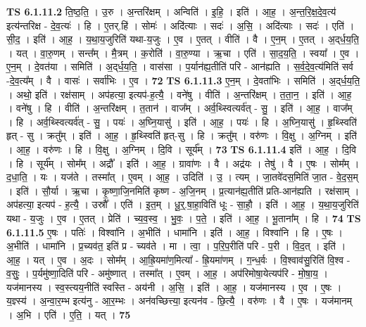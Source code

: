 \documentclass[17pt]{extarticle}
\begin{document}
                                \textbf{ TS 6.1.11.2} \newline
                  ति॒ष्ठ॒ति॒ । उ॒रु । अ॒न्तरि॑क्षम् । अन्विति॑ । इ॒हि॒ । इति॑ । आ॒ह॒ । अ॒न्त॒रि॒क्ष॒दे॒व॒त्य॑ इत्य॑न्तरिक्ष - दे॒व॒त्यः॑ । हि । ए॒तर्.हि॑ । सोमः॑ । अदि॑त्याः । सदः॑ । अ॒सि॒ । अदि॑त्याः । सदः॑ । एति॑ । सी॒द॒ । इति॑ । आ॒ह॒ । य॒था॒य॒जुरिति॑ यथा-य॒जुः । ए॒व । ए॒तत् । वीति॑ । वै । ए॒न॒म् । ए॒तत् । अ॒द्‌र्ध॒य॒ति॒ । यत् । वा॒रु॒णम् । सन्त᳚म् । मै॒त्रम् । क॒रोति॑ । वा॒रु॒ण्या । ऋ॒चा । एति॑ । सा॒द॒य॒ति॒ । स्वया᳚ । ए॒व । ए॒न॒म् । दे॒वत॑या । समिति॑ । अ॒द्‌र्ध॒य॒ति॒ । वास॑सा । प॒र्यान॑ह्य॒तीति॑ परि - आन॑ह्यति । स॒र्व॒दे॒व॒त्य॑मिति॑ सर्व -दे॒व॒त्य᳚म् । वै । वासः॑ । सर्वा॑भिः । ए॒व । \textbf{  72} \newline
                  \newline
                                \textbf{ TS 6.1.11.3} \newline
                  ए॒न॒म् । दे॒वता॑भिः । समिति॑ । अ॒द्‌र्ध॒य॒ति॒ । अथो॒ इति॑ । रक्ष॑साम् । अप॑हत्या॒ इत्यप॑-ह॒त्यै॒ । वने॑षु । वीति॑ । अ॒न्तरि॑क्षम् । त॒ता॒न॒ । इति॑ । आ॒ह॒ । वने॑षु । हि । वीति॑ । अ॒न्तरि॑क्षम् । त॒तान॑ । वाज᳚म् । अर्व॒थ्स्वित्यर्व॑त् - सु॒ । इति॑ । आ॒ह॒ । वाज᳚म् । हि । अर्व॒थ्स्वित्यर्व॑त् - सु॒ । पयः॑ । अ॒घ्नि॒यासु॑ । इति॑ । आ॒ह॒ । पयः॑ । हि । अ॒घ्नि॒यासु॑ । हृ॒थ्स्विति॑ हृत् - सु । क्रतु᳚म् । इति॑ । आ॒ह॒ । हृ॒थ्स्विति॑ हृत्-सु । हि । क्रतु᳚म् । वरु॑णः । वि॒क्षु । अ॒ग्निम् । इति॑ । आ॒ह॒ । वरु॑णः । हि । वि॒क्षु । अ॒ग्निम् । दि॒वि । सूर्य᳚म् । \textbf{  73} \newline
                  \newline
                                \textbf{ TS 6.1.11.4} \newline
                  इति॑ । आ॒ह॒ । दि॒वि । हि । सूर्य᳚म् । सोम᳚म् । अद्रौ᳚ । इति॑ । आ॒ह॒ । ग्रावा॑णः । वै । अद्र॑यः । तेषु॑ । वै । ए॒षः । सोम᳚म् । द॒धा॒ति॒ । यः । यज॑ते । तस्मा᳚त् । ए॒वम् । आ॒ह॒ । उदिति॑ । उ॒ । त्यम् । जा॒तवे॑दस॒मिति॑ जा॒त - वे॒द॒स॒म् । इति॑ । सौ॒र्या । ऋ॒चा । कृ॒ष्णा॒जि॒नमिति॑ कृष्ण - अ॒जि॒नम् । प्र॒त्यान॑ह्य॒तीति॑ प्रति-आन॑ह्यति । रक्ष॑साम् । अप॑हत्या॒ इत्यप॑ - ह॒त्यै॒ । उस्रौ᳚ । एति॑ । इ॒त॒म् । धू॒र्॒.षा॒हा॒विति॑ धूः - सा॒हौ॒ । इति॑ । आ॒ह॒ । य॒था॒य॒जुरिति॑ यथा - य॒जुः । ए॒व । ए॒तत् । प्रेति॑ । च्य॒व॒स्व॒ । भु॒वः॒ । प॒ते॒ । इति॑ । आ॒ह॒ । भू॒ताना᳚म् । हि । \textbf{  74} \newline
                  \newline
                                \textbf{ TS 6.1.11.5} \newline
                  ए॒षः । पतिः॑ । विश्वा॑नि । अ॒भीति॑ । धामा॑नि । इति॑ । आ॒ह॒ । विश्वा॑नि । हि । ए॒षः । अ॒भीति॑ । धामा॑नि । प्र॒च्यव॑त॒ इति॑ प्र - च्यव॑ते । मा । त्वा॒ । प॒रि॒प॒रीति॑ परि - प॒री । वि॒द॒त् । इति॑ । आ॒ह॒ । यत् । ए॒व । अ॒दः । सोम᳚म् । आ॒ह्रि॒यमा॑ण॒मित्या᳚ - ह्रि॒यमा॑णम् । ग॒न्ध॒र्वः । वि॒श्वाव॑सु॒रिति॑ वि॒श्व - व॒सुः॒ । प॒र्यमु॑ष्णा॒दिति॑ परि - अमु॑ष्णात् । तस्मा᳚त् । ए॒वम् । आ॒ह॒ । अप॑रिमोषा॒येत्यप॑रि - मो॒षा॒य॒ । यज॑मानस्य । स्व॒स्त्यय॒नीति॑ स्वस्ति - अय॑नी । अ॒सि॒ । इति॑ । आ॒ह॒ । यज॑मानस्य । ए॒व । ए॒षः । य॒ज्ञ्स्य॑ । अ॒न्वा॒र॒म्भ इत्य॑नु - आ॒र॒म्भः । अन॑वच्छित्त्या॒ इत्यन॑व - छि॒त्यै॒ । वरु॑णः । वै । ए॒षः । यज॑मानम् । अ॒भि । एति॑ । ए॒ति॒ । यत् । \textbf{  75} \newline
\end{document}
